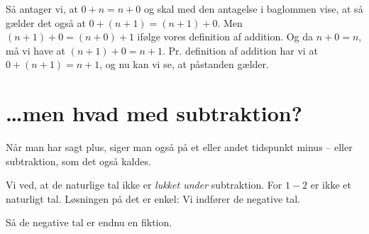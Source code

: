 Så antager vi, at $0+n = n+0$ og skal med den antagelse i baglommen vise, at så gælder det også at $0 + (n+1) = (n+1) + 0$. Men $(n+1) + 0 = (n+0)+1$ ifølge vores definition af addition. Og da $n+0 = n$, må vi have at $(n+1) + 0 = n +1 $. Pr. definition af addition har vi at $0 + (n+1) = n+1$, og nu kan vi se, at påstanden gælder.

\section{\ldots men hvad med subtraktion?}

Når man har sagt plus, siger man også på et eller andet tidspunkt minus -- eller subtraktion, som det også kaldes.

Vi ved, at de naturlige tal ikke er \emph{lukket under} subtraktion. For $1-2$ er ikke et naturligt tal. Løsningen på det er enkel: Vi indfører de negative tal.

Så de negative tal er endnu en fiktion.